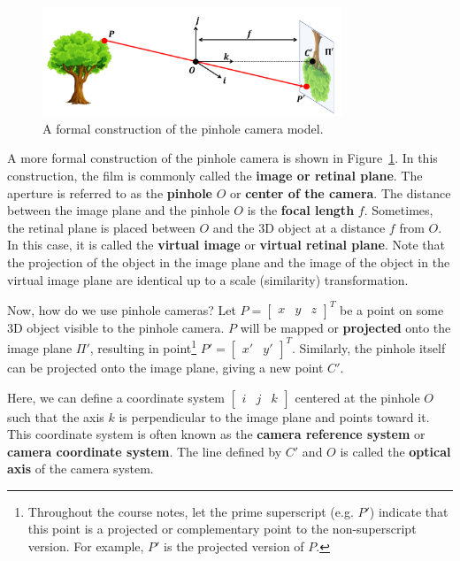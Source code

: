 \documentclass[a4paper, 12pt]{article}
\renewcommand\emph{\textbf}
\begin{document}
\begin{figure}[h!]
\centering
\includegraphics[width=0.8\textwidth]{figures/1-2.pdf}
\caption{A formal construction of the pinhole camera model.}
\label{fig:pinholeCamera}
\end{figure}
A more formal construction of the pinhole camera is shown in Figure~\ref{fig:pinholeCamera}. In this construction, the film is commonly called the \emph{image or retinal plane}. The aperture is referred to as the \emph{pinhole} $O$ or \emph{center of the camera}. The distance between the image plane and the pinhole $O$ is the \emph{focal length} $f$. Sometimes, the retinal plane is placed between $O$ and the 3D object at a distance $f$ from $O$. In this case, it is called the \emph{virtual image} or \emph{virtual retinal plane}. Note that the projection of the object in the image plane and the image of the object in the virtual image plane are identical up to a scale (similarity) transformation.

Now, how do we use pinhole cameras? Let $P = \begin{bmatrix}x & y & z\end{bmatrix}^T$ be a point on some 3D object visible to the pinhole camera. $P$ will be mapped or \textbf{projected} onto the image plane $\Pi'$, resulting in point\footnote{Throughout the course notes, let the prime superscript (e.g. $P'$) indicate that this point is a projected or complementary point to the non-superscript version. For example, $P'$ is the projected version of $P$.} $P' = \begin{bmatrix}x' & y'\end{bmatrix}^T$. Similarly, the pinhole itself can be projected onto the image plane, giving a new point $C'$. 

Here, we can define a coordinate system $\begin{bmatrix}i & j & k\end{bmatrix}$ centered at the pinhole $O$ such that the axis $k$ is perpendicular to the image plane and points toward it. This coordinate system is often known as the \emph{camera reference system} or \emph{camera coordinate system}. The line defined by $C'$ and $O$ is called the \emph{optical axis} of the camera system.
\end{document}
